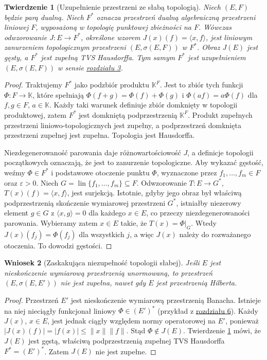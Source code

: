 \documentclass[11pt,a4paper]{article}
\numberwithin{equation}{section}
\theoremstyle{plain}
\newtheorem{twierdzenie}{Twierdzenie}[section]
\newtheorem{wniosek}[twierdzenie]{Wniosek}
\theoremstyle{definition}
\theoremstyle{remark}
\newcommand{\K}{\mathbb K}
\begin{document}
\begin{twierdzenie}[Uzupełnienie przestrzeni ze słabą topologią]
\label{thm:slabe-uzupelnienie}
Niech $(E,F)$ będzie parą dualną. Niech $F^*$ oznacza
przestrzeń dualną algebraiczną przestrzeni liniowej $F$,
wyposażoną w topologię punktowej zbieżności na $F$.
Wówczas odwzorowanie $J:E\to F^*$, określone wzorem
$J(x)(f)=\langle x,f\rangle$, jest liniowym zanurzeniem
topologicznym przestrzeni $(E,\sigma(E,F))$ w $F^*$.
Obraz $J(E)$ jest gęsty, a $F^*$ jest zupełną TVS
Hausdorffa. Tym samym $F^*$ jest uzupełnieniem
$(E,\sigma(E,F))$ w sensie \hyperref[sec:zupelnosc]{rozdziału 3}.
\end{twierdzenie}
\begin{proof}
Traktujemy $F^*$ jako podzbiór produktu $\K^F$.
Jest to zbiór tych funkcji $\Phi:F\to\K$, które spełniają
$\Phi(f+g)=\Phi(f)+\Phi(g)$ i
$\Phi(af)=a\Phi(f)$ dla $f,g\in F$, $a\in\K$.
Każdy taki warunek definiuje zbiór domknięty w topologii
produktowej, zatem $F^*$ jest domkniętą podprzestrzenią
$\K^F$. Produkt zupełnych przestrzeni liniowo-topologicznych
jest zupełny, a podprzestrzeń domknięta przestrzeni
zupełnej jest zupełna. Topologia jest Hausdorffa.

Niezdegenerowaność parowania daje różnowartościowość $J$,
a definicje topologii początkowych oznaczają, że jest to
zanurzenie topologiczne. Aby wykazać gęstość, weźmy
$\Phi\in F^*$ i podstawowe otoczenie punktu $\Phi$,
wyznaczone przez $f_1,\ldots,f_m\in F$ oraz $\varepsilon>0$.
Niech $G=\operatorname{lin}\{f_1,\ldots,f_m\}\subseteq F$.
Odwzorowanie $T:E\to G^*$, $T(x)(f)=\langle x,f\rangle$,
jest surjekcją. Istotnie, gdyby jego obraz był właściwą
podprzestrzenią skończenie wymiarowej przestrzeni $G^*$,
istniałby niezerowy element $g\in G$ z
$\langle x,g\rangle=0$ dla każdego $x\in E$,
co przeczy niezdegenerowaności parowania.
Wybieramy zatem $x\in E$ takie, że
$T(x)=\Phi|_G$. Wtedy $J(x)(f_j)=\Phi(f_j)$
dla wszystkich $j$, a więc $J(x)$ należy do rozważanego
otoczenia. To dowodzi gęstości.
\end{proof}

\begin{wniosek}[Zaskakująca niezupełność topologii słabej]
\label{cor:slabe-niezupełne}
Jeśli $E$ jest nieskończenie wymiarową przestrzenią
unormowaną, to przestrzeń $(E,\sigma(E,E'))$ nie jest
zupełna, nawet gdy $E$ jest przestrzenią Hilberta.
\end{wniosek}
\begin{proof}
Przestrzeń $E'$ jest nieskończenie wymiarową przestrzenią
Banacha. Istnieje na niej nieciągły funkcjonał liniowy
$\Phi\in(E')^*$ (przykład z \hyperref[sec:hahn-banach]{rozdziału 6}).
Każdy $J(x)$, $x\in E$, jest jednak ciągły względem normy
operatorowej na $E'$, ponieważ
$|J(x)(f)|=|f(x)|\le\|x\|\|f\|$.
Stąd $\Phi\notin J(E)$. Twierdzenie
\ref{thm:slabe-uzupelnienie} mówi, że $J(E)$ jest
gęstą, właściwą podprzestrzenią zupełnej TVS Hausdorffa
$F^*=(E')^*$. Zatem $J(E)$ nie jest zupełne.
\end{proof}
\end{document}
